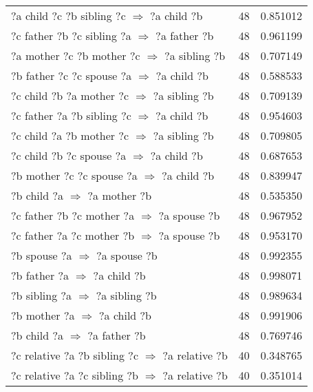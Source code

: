 \begin{longtable}{lrr}
       ?a  child  ?c  ?b  sibling  ?c   $\Rightarrow$ ?a  child  ?b &           48 &        0.851012 \\
     ?c  father  ?b  ?c  sibling  ?a   $\Rightarrow$ ?a  father  ?b &           48 &        0.961199 \\
     ?a  mother  ?c  ?b  mother  ?c   $\Rightarrow$ ?a  sibling  ?b &           48 &        0.707149 \\
       ?b  father  ?c  ?c  spouse  ?a   $\Rightarrow$ ?a  child  ?b &           48 &        0.588533 \\
      ?c  child  ?b  ?a  mother  ?c   $\Rightarrow$ ?a  sibling  ?b &           48 &        0.709139 \\
      ?c  father  ?a  ?b  sibling  ?c   $\Rightarrow$ ?a  child  ?b &           48 &        0.954603 \\
      ?c  child  ?a  ?b  mother  ?c   $\Rightarrow$ ?a  sibling  ?b &           48 &        0.709805 \\
        ?c  child  ?b  ?c  spouse  ?a   $\Rightarrow$ ?a  child  ?b &           48 &        0.687653 \\
       ?b  mother  ?c  ?c  spouse  ?a   $\Rightarrow$ ?a  child  ?b &           48 &        0.839947 \\
                       ?b  child  ?a   $\Rightarrow$ ?a  mother  ?b &           48 &        0.535350 \\
      ?c  father  ?b  ?c  mother  ?a   $\Rightarrow$ ?a  spouse  ?b &           48 &        0.967952 \\
      ?c  father  ?a  ?c  mother  ?b   $\Rightarrow$ ?a  spouse  ?b &           48 &        0.953170 \\
                      ?b  spouse  ?a   $\Rightarrow$ ?a  spouse  ?b &           48 &        0.992355 \\
                       ?b  father  ?a   $\Rightarrow$ ?a  child  ?b &           48 &        0.998071 \\
                    ?b  sibling  ?a   $\Rightarrow$ ?a  sibling  ?b &           48 &        0.989634 \\
                       ?b  mother  ?a   $\Rightarrow$ ?a  child  ?b &           48 &        0.991906 \\
                       ?b  child  ?a   $\Rightarrow$ ?a  father  ?b &           48 &        0.769746 \\
 ?c  relative  ?a  ?b  sibling  ?c   $\Rightarrow$ ?a  relative  ?b &           40 &        0.348765 \\
 ?c  relative  ?a  ?c  sibling  ?b   $\Rightarrow$ ?a  relative  ?b &           40 &        0.351014 \\

\end{longtable}
